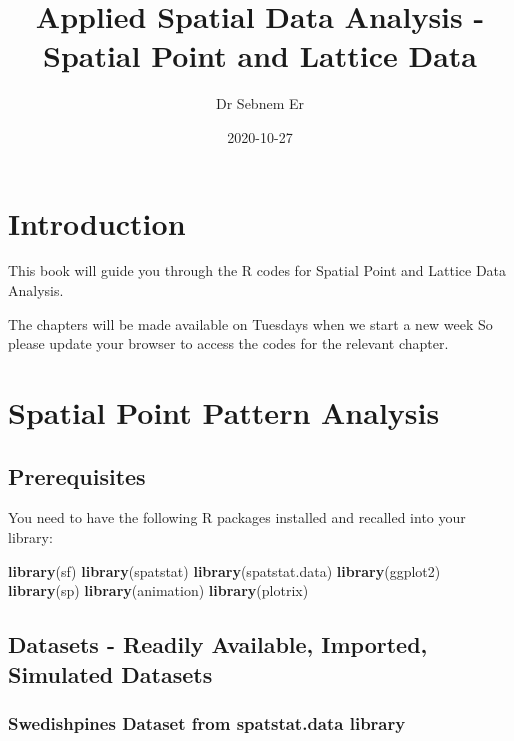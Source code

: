 \documentclass[
]{book}
\title{Applied Spatial Data Analysis - Spatial Point and Lattice Data}
\author{Dr Sebnem Er}
\date{2020-10-27}
\newenvironment{Shaded}{\begin{snugshade}}{\end{snugshade}}
\newcommand{\KeywordTok}[1]{\textcolor[rgb]{0.13,0.29,0.53}{\textbf{#1}}}
\newcommand{\NormalTok}[1]{#1}
\begin{document}
\maketitle

{
\setcounter{tocdepth}{1}
\tableofcontents
}
\hypertarget{introduction}{%
\chapter{Introduction}\label{introduction}}

This book will guide you through the R codes for Spatial Point and Lattice Data Analysis.

The chapters will be made available on Tuesdays when we start a new week So please update your browser to access the codes for the relevant chapter.

\hypertarget{spatial-point-pattern-analysis}{%
\chapter{Spatial Point Pattern Analysis}\label{spatial-point-pattern-analysis}}

\hypertarget{prerequisites}{%
\section{Prerequisites}\label{prerequisites}}

You need to have the following R packages installed and recalled into your library:

\begin{Shaded}
\begin{Highlighting}[]
\KeywordTok{library}\NormalTok{(sf)}
\KeywordTok{library}\NormalTok{(spatstat)}
\KeywordTok{library}\NormalTok{(spatstat.data)}
\KeywordTok{library}\NormalTok{(ggplot2)}
\KeywordTok{library}\NormalTok{(sp)}
\KeywordTok{library}\NormalTok{(animation)}
\KeywordTok{library}\NormalTok{(plotrix)}
\end{Highlighting}
\end{Shaded}

\hypertarget{datasets---readily-available-imported-simulated-datasets}{%
\section{Datasets - Readily Available, Imported, Simulated Datasets}\label{datasets---readily-available-imported-simulated-datasets}}

\hypertarget{swedishpines-dataset-from-spatstat.data-library}{%
\subsection{Swedishpines Dataset from spatstat.data library}\label{swedishpines-dataset-from-spatstat.data-library}}
\end{document}
